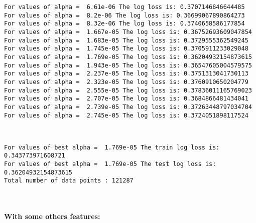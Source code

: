 \documentclass[11pt]{article}
\begin{document}
    \begin{Verbatim}[commandchars=\\\{\}]
For values of alpha =  6.61e-06 The log loss is: 0.3707146846644485
For values of alpha =  8.2e-06 The log loss is: 0.36699067890864273
For values of alpha =  8.32e-06 The log loss is: 0.3740658586177854
For values of alpha =  1.667e-05 The log loss is: 0.36752693609047854
For values of alpha =  1.683e-05 The log loss is: 0.3729555362549245
For values of alpha =  1.745e-05 The log loss is: 0.3705911233029048
For values of alpha =  1.769e-05 The log loss is: 0.36204932154873615
For values of alpha =  1.943e-05 The log loss is: 0.36547605004579575
For values of alpha =  2.237e-05 The log loss is: 0.3751313041730113
For values of alpha =  2.323e-05 The log loss is: 0.3760910650204779
For values of alpha =  2.555e-05 The log loss is: 0.37836011165769023
For values of alpha =  2.707e-05 The log loss is: 0.3684866481434041
For values of alpha =  2.739e-05 The log loss is: 0.37263448797034704
For values of alpha =  2.745e-05 The log loss is: 0.3724051898117524

    \end{Verbatim}

    \begin{center}
    \end{center}
    { \hspace*{\fill} \\}
    
    \begin{Verbatim}[commandchars=\\\{\}]
For values of best alpha =  1.769e-05 The train log loss is: 0.343773971608721
For values of best alpha =  1.769e-05 The test log loss is: 0.36204932154873615
Total number of data points : 121287

    \end{Verbatim}

    \begin{center}
    \end{center}
    { \hspace*{\fill} \\}
    
    \paragraph{With some others features:}\label{with-some-others-features}
\end{document}
